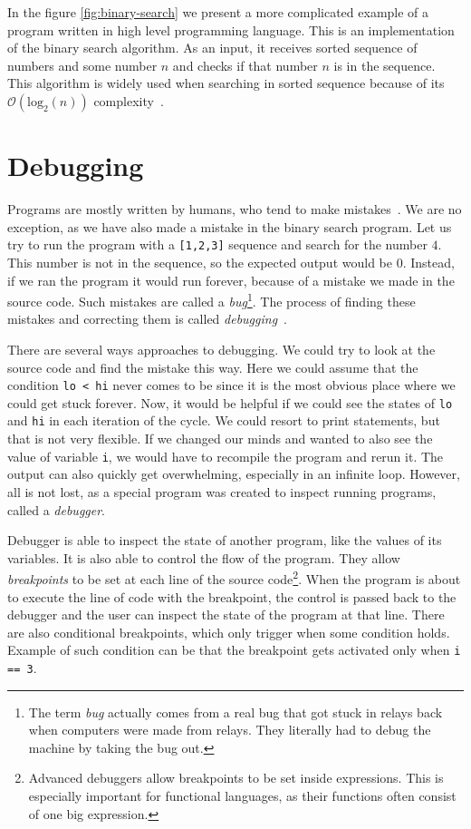 In the figure \ref{fig:binary-search} we present a more complicated example of
a program written in high level programming language. This is an implementation
of the binary search algorithm. As an input, it receives sorted sequence of
numbers and some number $n$ and checks if that number $n$ is in the sequence.
This algorithm is widely used when searching in sorted sequence because of its
$\mathcal{O}(\text{log}_2(n))$ complexity~\cite{pruvodce}.

\section{Debugging}
Programs are mostly written by humans, who tend to make
mistakes~\cite{human-error}. We are no exception, as we have also made a
mistake in the binary search program. Let us try to run the program with a
\texttt{[1,2,3]} sequence and search for the number $4$. This number is not in
the sequence, so the expected output would be $0$. Instead, if we ran the
program it would run forever, because of a mistake we made in the source code.
Such mistakes are called a \textit{bug}\footnote{The term \textit{bug}
actually comes from a real bug that got stuck in relays back when computers
were made from relays. They literally had to debug the machine by taking the
bug out.}. The process of finding these mistakes and correcting them is called
\textit{debugging}~\cite{art-of-testing}.

There are several ways approaches to debugging. We could try to look at the
source code and find the mistake this way. Here we could assume that the
condition \texttt{lo < hi} never comes to be since it is the most obvious place
where we could get stuck forever. Now, it would be helpful if we could see the
states of \texttt{lo} and \texttt{hi} in each iteration of the cycle. We could
resort to print statements, but that is not very flexible. If we changed our
minds and wanted to also see the value of variable \texttt{i}, we would have to
recompile the program and rerun it. The output can also quickly get
overwhelming, especially in an infinite loop. However, all is not lost, as a
special program was created to inspect running programs, called a
\textit{debugger}.

Debugger is able to inspect the state of another program, like the values of
its variables. It is also able to control the flow of the program. They allow
\textit{breakpoints} to be set at each line of the source
code\footnote{Advanced debuggers allow breakpoints to be set inside
expressions. This is especially important for functional languages, as their
functions often consist of one big expression.}. When the program is about to
execute the line of code with the breakpoint, the control is passed back to the
debugger and the user can inspect the state of the program at that line. There
are also conditional breakpoints, which only trigger when some condition holds.
Example of such condition can be that the breakpoint gets activated only when
\texttt{i == 3}.

